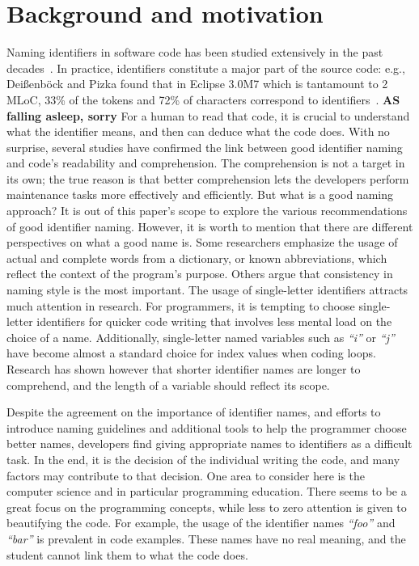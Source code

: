 \documentclass[conference]{IEEEtran}
\newcommand{\todo}[1]{ \textbf{#1} }
\newcommand{\quotes}[1]{\textit{``#1''}}
\begin{document}
\section{Background and motivation}
Naming identifiers in software code has been studied extensively in the past decades~\cite{AmanASK15,AnquetilL98,AvidanF17,Beniamini,ButlerWYS10,CaprileT00,HofmeisterSH17,LawrieMFB07,LunguK13,ScannielloR13,TakangGM96,TramontanaRS14}. 
In practice, identifiers constitute a major part of the source code: e.g., Dei{\ss}enb{\"o}ck and Pizka found that in Eclipse 3.0M7 which is tantamount to 2 MLoC, 33\% of the tokens and 72\% of characters correspond to identifiers~\cite{Deissenbock}. 
\todo{AS falling asleep, sorry}
For a human to read that code, it is crucial to understand what the identifier means, and then can deduce what the code does. 
With no surprise, several studies have confirmed the link between good identifier naming and code's readability and comprehension. 
The comprehension is not a target in its own; the true reason is that better comprehension lets the developers perform maintenance tasks more effectively and efficiently.
But what is a good naming approach? 
It is out of this paper's scope to explore the various recommendations of good identifier naming. 
However, it is worth to mention that there are different perspectives on what a good name is. 
Some researchers emphasize the usage of actual and complete words from a dictionary, or known abbreviations, which reflect the context of the program's purpose. 
Others argue that consistency in naming style is the most important. 
The usage of single-letter identifiers attracts much attention in research. 
For programmers, it is tempting to choose single-letter identifiers for quicker code writing that involves less mental load on the choice of a name. 
Additionally, single-letter named variables such as \quotes{i} or \quotes{j} have become almost a standard choice for index values when coding loops. 
Research has shown however that shorter identifier names are longer to comprehend, and the length of a variable should reflect its scope. 

Despite the agreement on the importance of identifier names, and efforts to introduce naming guidelines and additional tools to help the programmer choose better names, developers find giving appropriate names to identifiers as a difficult task. In the end, it is the decision of the individual writing the code, and many factors may contribute to that decision. One area to consider here is the computer science and in particular programming education. There seems to be a great focus on the programming concepts, while less to zero attention is given to beautifying the code. For example, the usage of the identifier names \quotes{foo} and \quotes{bar} is prevalent in code examples. These names have no real meaning, and the student cannot link them to what the code does.  
\end{document}
